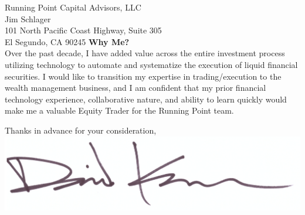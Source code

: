 \documentclass{letter}
\begin{document}
\begin{letter}{
  Running Point Capital Advisors, LLC \\
  Jim Schlager \\
  101 North Pacific Coast Highway, Suite 305 \\
  El Segundo, CA 90245
}
\textbf{Why Me?} \\
Over the past decade, I have added value across the entire investment process
utilizing technology to automate and systematize the execution of liquid financial
securities. I would like to transition my expertise in trading/execution to
the wealth management business, and I am confident that my
prior financial technology experience, collaborative nature, and ability to
learn quickly would make me a valuable Equity Trader for the Running Point team.
 
\closing{
  Thanks in advance for your consideration, \\
  \vspace{.33in}
  \includegraphics[scale=0.33]{signature.png}
}

\end{letter}
\end{document}
